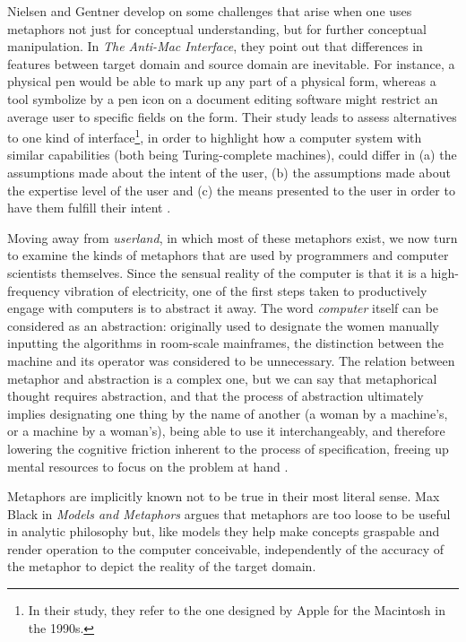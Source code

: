 Nielsen and Gentner develop on some challenges that arise when one uses metaphors not just for conceptual understanding, but for further conceptual manipulation. In \emph{The Anti-Mac Interface}, they point out that differences in features between target domain and source domain are inevitable. For instance, a physical pen would be able to mark up any part of a physical form, whereas a tool symbolize by a pen icon on a document editing software might restrict an average user to specific fields on the form. Their study leads to assess alternatives to one kind of interface\footnote{In their study, they refer to the one designed by Apple for the Macintosh in the 1990s.}, in order to highlight how a computer system with similar capabilities (both being Turing-complete machines), could differ in (a) the assumptions made about the intent of the user, (b) the assumptions made about the expertise level of the user and (c) the means presented to the user in order to have them fulfill their intent \citep{gentner_antimac_1996}.

Moving away from \emph{userland}, in which most of these metaphors exist, we now turn to examine the kinds of metaphors that are used by programmers and computer scientists themselves. Since the sensual reality of the computer is that it is a high-frequency vibration of electricity, one of the first steps taken to productively engage with computers is to abstract it away. The word \emph{computer} itself can be considered as an abstraction: originally used to designate the women manually inputting the algorithms in room-scale mainframes, the distinction between the machine and its operator was considered to be unnecessary. The relation between metaphor and abstraction is a complex one, but we can say that metaphorical thought requires abstraction, and that the process of abstraction ultimately implies designating one thing by the name of another (a woman by a machine's, or a machine by a woman's), being able to use it interchangeably, and therefore lowering the cognitive friction inherent to the process of specification, freeing up mental resources to focus on the problem at hand \citep{chun_software_2005}.

Metaphors are implicitly known not to be true in their most literal sense. Max Black in \emph{Models and Metaphors} argues that metaphors are too loose to be useful in analytic philosophy but, like models they help make concepts graspable and render operation to the computer conceivable, independently of the accuracy of the metaphor to depict the reality of the target domain.

